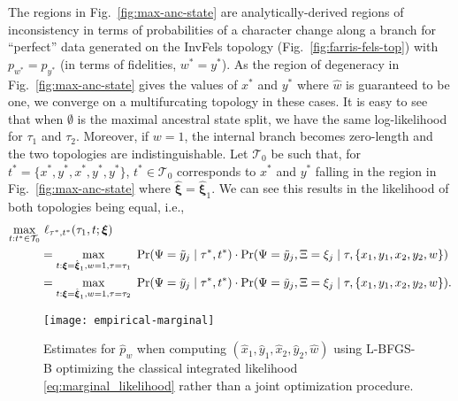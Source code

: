 The regions in Fig.~\ref{fig:max-anc-state} are analytically-derived regions of inconsistency in terms of probabilities of a character change along a branch for ``perfect'' data generated on the InvFels topology (Fig.~\ref{fig:farris-fels-top}) with $p_{w^*} = p_{y^*}$ (in terms of fidelities, $w^*=y^*$).
As the region of degeneracy in Fig.~\ref{fig:max-anc-state} gives the values of $x^*$ and $y^*$ where $\hat{w}$ is guaranteed to be one, we converge on a multifurcating topology in these cases.
It is easy to see that when $\emptyset$ is the maximal ancestral state split, we have the same log-likelihood for $\tau_1$ and $\tau_2$.
Moreover, if $w=1$, the internal branch becomes zero-length and the two topologies are indistinguishable.
Let $\mathcal{T}_0$ be such that, for $t^*=\{x^*,y^*,x^*,y^*,y^*\}$, $t^*\in\mathcal{T}_0$ corresponds to $x^*$ and $y^*$ falling in the region in Fig.~\ref{fig:max-anc-state} where $\hat{\boldsymbol\xi}=\hat{\boldsymbol\xi}_1$.
We can see this results in the likelihood of both topologies being equal, i.e.,
\begin{align*}
\max_{t : t^*\in\mathcal{T}_0} & \ \ell_{\tau^*,t^*}(\tau_1, t; \boldsymbol\xi)\\
&= \max_{t: \boldsymbol\xi=\hat{\boldsymbol\xi}_1, w=1, \tau=\tau_1} \ \Pr(\Psi=\tilde{y}_j \mid \tau^*, t^*) \cdot \Pr(\Psi=\tilde{y}_j, \Xi=\xi_j \mid \tau, \{x_1,y_1,x_2,y_2,w\})\\
&= \max_{t: \boldsymbol\xi=\hat{\boldsymbol\xi}_1, w=1, \tau=\tau_2} \ \Pr(\Psi=\tilde{y}_j \mid \tau^*, t^*) \cdot \Pr(\Psi=\tilde{y}_j, \Xi=\xi_j \mid \tau, \{x_1,y_1,x_2,y_2,w\}).
\end{align*}


\begin{figure}
\centering
\texttt{[image: empirical-marginal]}
\caption{
    Estimates for $\hat{p}_w$ when computing $(\hat{x}_1, \hat{y}_1, \hat{x}_2, \hat{y}_2, \hat{w})$ using L-BFGS-B optimizing the classical integrated likelihood \eqref{eq:marginal_likelihood} rather than a joint optimization procedure.
}
\label{fig:bl-general-marginal}
\end{figure}
%

